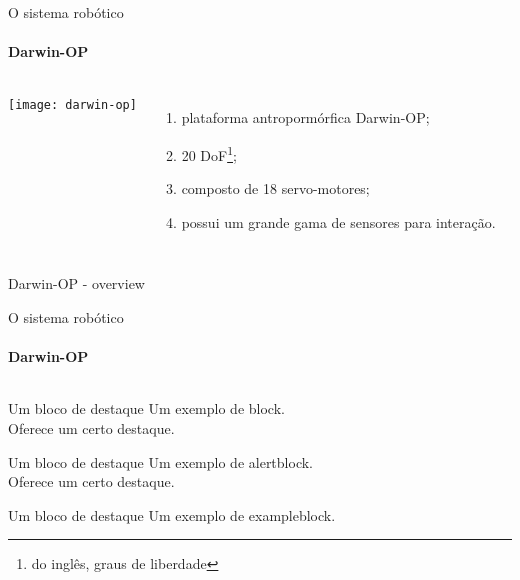 \begin{frame}[t]{O sistema robótico}
  \transboxout[duration=0.5]
  \framesubtitle{Darwin-OP}
  \begin{columns}
    \texttt{[image: darwin-op]}
    \begin{enumerate}
      \item plataforma antropormórfica Darwin-OP;
      \item 20 DoF\footnote{do inglês, graus de liberdade};
      \item composto de 18 servo-motores;
      \item possui um grande gama de sensores para interação.
    \end{enumerate}
  \end{columns}
\end{frame}
\begin{frame}[c]{Darwin-OP - overview}
  \centering


\end{frame}
\begin{frame}[t]{O sistema robótico}
  \transboxout[duration=0.5]
  \framesubtitle{Darwin-OP}
  \begin{columns}
  \end{columns}

  \begin{block}{Um bloco de destaque}
    Um exemplo de block.\\
    Oferece um certo destaque.
  \end{block}

  \begin{alertblock}{Um bloco de destaque}
    Um exemplo de alertblock.\\
    Oferece um certo destaque.
  \end{alertblock}

  \begin{exampleblock}{Um bloco de destaque}
    Um exemplo de exampleblock.
  \end{exampleblock}
\end{frame}
